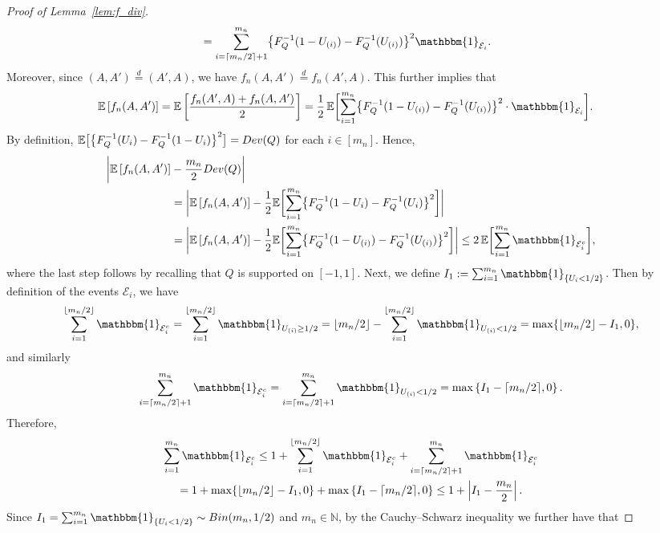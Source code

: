 \documentclass[12pt]{article}
\newcommand{\EE}[1]{\mathbb{E}\left[{#1}\right]}
\newcommand{\one}[1]{{\mathbbm{1}}_{{#1}}}
\begin{document}
\begin{proof}[Proof of Lemma~\ref{lem:f_div}]
\begin{align*}
&=\sum_{i=\lceil m_n/2\rceil+1}^{m_n}
\bigl\{F_Q^{-1}(1-U_{(i)}) - F_Q^{-1}(U_{(i)})\bigr\}^2\one{\mathcal{E}_i}.
\end{align*}
Moreover, since $(A,A') \stackrel{d}{=} (A',A)$, we have $f_n(A,A') \stackrel{d}{=} f_n(A',A)$.
This further implies that
\begin{align*}
    \EE{f_n(A,A')}&=\EE{\frac{f_n(A',A)+f_n(A,A')}{2}}
  =\frac{1}{2}\, \mathbb{E}\biggl[ \sum_{i=1}^ {m_n} \bigl\{F_Q^{-1}(1-U_{(i)}) - F_Q^{-1}(U_{(i)})\bigr\}^2\cdot\one{\mathcal{E}_i}\biggr].
\end{align*}
By definition, $\mathbb{E}\bigl[\bigl\{F_Q^{-1}(U_i) - F_Q^{-1}(1-U_i)\bigr\}^2\bigr] = \textnormal{Dev}(Q)$ for each $i\in [m_n]$. Hence,
\begin{align}\label{eqn:f_n-split-2}
    \biggl|\EE{f_n(A,A')}& -\frac{m_n}{2}\textnormal{Dev}(Q)\biggr|\nonumber\\
    &=\biggl| \EE{f_n(A,A')} -  \frac{1}{2} \mathbb{E}\biggl[\sum_{i=1}^{m_n} \bigl\{F_Q^{-1}(1-U_i) - F_Q^{-1}(U_i)\bigr\}^2\biggr]\biggr|\nonumber\\
    &=\biggl| \EE{f_n(A,A')} -  \frac{1}{2} \mathbb{E}\biggl[\sum_{i=1}^{m_n} \bigl\{F_Q^{-1}(1-U_{(i)}) - F_Q^{-1}(U_{(i)})\bigr\}^2\biggr]\biggr| \leq  2\, \mathbb{E}\biggl[\sum_{i=1}^{m_n}\one{\mathcal{E}_i^c}\biggr],
\end{align}
where the last step follows by recalling that $Q$ is supported on $[-1,1]$.
Next, we define $I_1 := \sum_{i=1}^{m_n}\one{\{U_i<1/2\}}$.
Then by definition of the events $\mathcal{E}_i$, we have
\[\sum_{i=1}^{\lfloor m_n/2\rfloor}\one{\mathcal{E}_i^c} = \sum_{i=1}^{\lfloor m_n/2\rfloor}\one{U_{(i)} \geq 1/2} = \lfloor m_n/2\rfloor - \sum_{i=1}^{\lfloor m_n/2\rfloor}\one{U_{(i)} < 1/2} = \max\{\lfloor m_n/2\rfloor - I_1, 0\},\]
and similarly
\[\sum_{i=\lceil m_n/2\rceil + 1}^{m_n}\one{\mathcal{E}_i^c} = \sum_{i=\lceil m_n/2\rceil + 1}^{m_n}\one{U_{(i)} < 1/2} = \max\left\{I_1 - \lceil m_n/2\rceil, 0\right\}.\]
Therefore,
\begin{multline*}
\sum_{i=1}^{m_n}\one{\mathcal{E}_i^c}\leq 1 + \sum_{i=1}^{\lfloor m_n/2\rfloor}\one{\mathcal{E}_i^c} + \sum_{i=\lceil m_n/2\rceil+1}^{m_n}\one{\mathcal{E}_i^c}\\= 1+\max\{\lfloor m_n/2\rfloor - I_1, 0\}  + \max\left\{I_1 - \lceil m_n/2\rceil, 0\right\} \leq 1 + \left|I_1 - \frac{m_n}{2}\right|.
\end{multline*}
Since $I_1 = \sum_{i=1}^{m_n}\one{\{U_i<1/2\}}\sim \textnormal{Bin}(m_n,1/2)$ and $m_n\in \mathbb{N}$, by the Cauchy--Schwarz inequality we further have that

\end{proof}
\end{document}
